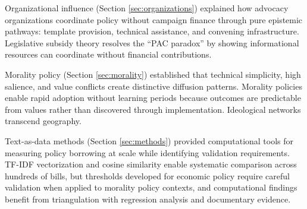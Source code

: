 Organizational influence (Section \ref{sec:organizations}) explained how advocacy organizations coordinate policy without campaign finance through pure epistemic pathways: template provision, technical assistance, and convening infrastructure. Legislative subsidy theory resolves the ``PAC paradox'' by showing informational resources can coordinate without financial contributions.

Morality policy (Section \ref{sec:morality}) established that technical simplicity, high salience, and value conflicts create distinctive diffusion patterns. Morality policies enable rapid adoption without learning periods because outcomes are predictable from values rather than discovered through implementation. Ideological networks transcend geography.

Text-as-data methods (Section \ref{sec:methods}) provided computational tools for measuring policy borrowing at scale while identifying validation requirements. TF-IDF vectorization and cosine similarity enable systematic comparison across hundreds of bills, but thresholds developed for economic policy require careful validation when applied to morality policy contexts, and computational findings benefit from triangulation with regression analysis and documentary evidence.

